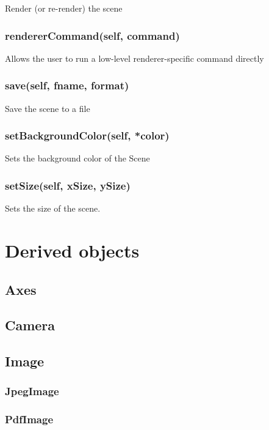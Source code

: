 Render (or re-render) the scene

\subsubsection{rendererCommand(self, command)}

Allows the user to run a low-level renderer-specific command directly

\subsubsection{save(self, fname, format)}

Save the scene to a file

\subsubsection{setBackgroundColor(self, *color)}

Sets the background color of the Scene

\subsubsection{setSize(self, xSize, ySize)}

Sets the size of the scene.

\section{Derived objects}

\subsection{Axes}

\subsection{Camera}

\subsection{Image}

\subsubsection{JpegImage}

\subsubsection{PdfImage}

